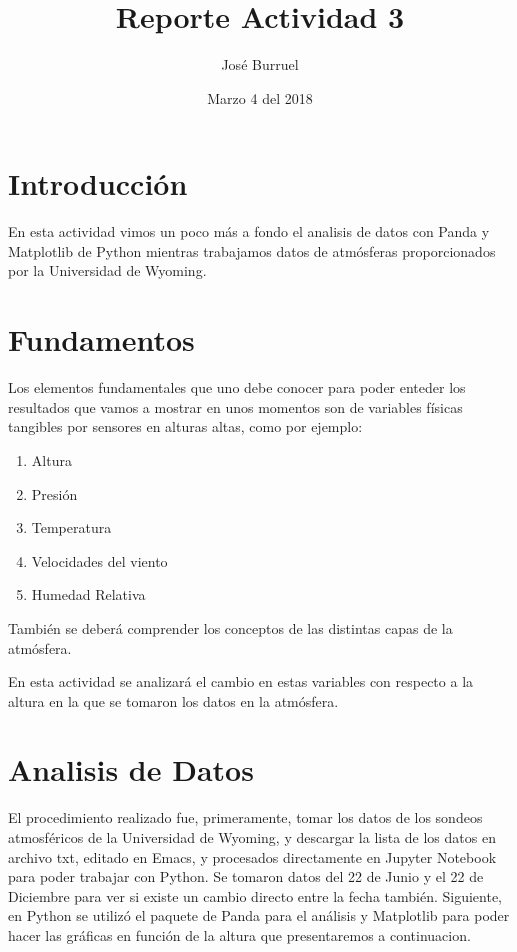 \documentclass{article}
\title{Reporte Actividad 3}
\author{José Burruel}
\date{Marzo 4 del 2018}
\begin{document}

\section{Introducción}
En esta actividad vimos un poco más a fondo el analisis de datos con Panda y Matplotlib de Python mientras trabajamos datos de atmósferas proporcionados por la Universidad de Wyoming.

\section{Fundamentos}
Los elementos fundamentales que uno debe conocer para poder enteder los resultados que vamos a mostrar en unos momentos son de variables físicas tangibles por sensores en alturas altas, como por ejemplo:

    \begin{enumerate}
        \item{Altura}
        \item{Presión}
        \item{Temperatura}
        \item{Velocidades del viento}
        \item{Humedad Relativa}
    \end{enumerate}

También se deberá comprender los conceptos de las distintas capas de la atmósfera.

En esta actividad se analizará el cambio en estas variables con respecto a la altura en la que se tomaron los datos en la atmósfera.

\section{Analisis de Datos}
El procedimiento realizado fue, primeramente, tomar los datos de los sondeos atmosféricos de la Universidad de Wyoming, y descargar la lista de los datos en archivo txt, editado en Emacs, y procesados directamente en Jupyter Notebook para poder trabajar con Python. Se tomaron datos del 22 de Junio y el 22 de Diciembre para ver si existe un cambio directo entre la fecha también.
Siguiente, en Python se utilizó el paquete de Panda para el análisis y Matplotlib para poder hacer las gráficas en función de la altura que presentaremos a continuacion.
\end{document}
